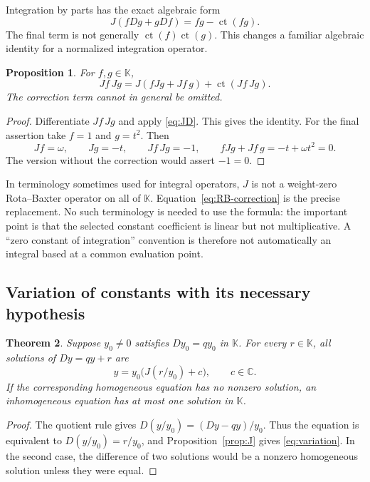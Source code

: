 \documentclass[11pt,a4paper]{article}
\numberwithin{equation}{section}
\newtheorem{theorem}{Theorem}[section]
\newtheorem{proposition}[theorem]{Proposition}
\theoremstyle{definition}
\theoremstyle{remark}
\newcommand{\K}{\mathbb K}
\newcommand{\C}{\mathbb C}
\newcommand{\ct}{\operatorname{ct}}
\begin{document}
Integration by parts has the exact algebraic form
\begin{equation}\label{eq:parts}
 J(fDg+gDf)=fg-\ct(fg).
\end{equation}
The final term is not generally $\ct(f)\ct(g)$. This changes a familiar
algebraic identity for a normalized integration operator.

\begin{proposition}\label{prop:RB}
For $f,g\in\K$,
\begin{equation}\label{eq:RB-correction}
 Jf\,Jg
 =J(fJg+Jf\,g)+\ct(Jf\,Jg).
\end{equation}
The correction term cannot in general be omitted.
\end{proposition}
\begin{proof}
Differentiate $Jf\,Jg$ and apply \eqref{eq:JD}. This gives the identity.
For the final assertion take $f=1$ and $g=t^2$. Then
\[
 Jf=\omega,\qquad Jg=-t,\qquad Jf\,Jg=-1,
 \qquad fJg+Jf\,g=-t+\omega t^2=0.
\]
The version without the correction would assert $-1=0$.
\end{proof}

In terminology sometimes used for integral operators, $J$ is not a
weight-zero Rota--Baxter operator on all of $\K$. Equation~\eqref{eq:RB-correction}
is the precise replacement. No such terminology is needed to use the
formula: the important point is that the selected constant coefficient is
linear but not multiplicative. A ``zero constant of integration'' convention
is therefore not automatically an integral based at a common evaluation
point.

\subsection{Variation of constants with its necessary hypothesis}

\begin{theorem}\label{thm:inhom}
Suppose $y_0\ne0$ satisfies $Dy_0=qy_0$ in $\K$. For every $r\in\K$, all
solutions of $Dy=qy+r$ are
\begin{equation}\label{eq:variation}
 y=y_0\bigl(J(r/y_0)+c\bigr),\qquad c\in\C.
\end{equation}
If the corresponding homogeneous equation has no nonzero solution, an
inhomogeneous equation has at most one solution in $\K$.
\end{theorem}
\begin{proof}
The quotient rule gives
$D(y/y_0)=(Dy-qy)/y_0$. Thus the equation is equivalent to
$D(y/y_0)=r/y_0$, and Proposition~\ref{prop:J} gives
\eqref{eq:variation}. In the second case, the difference of two solutions
would be a nonzero homogeneous solution unless they were equal.
\end{proof}
\end{document}
